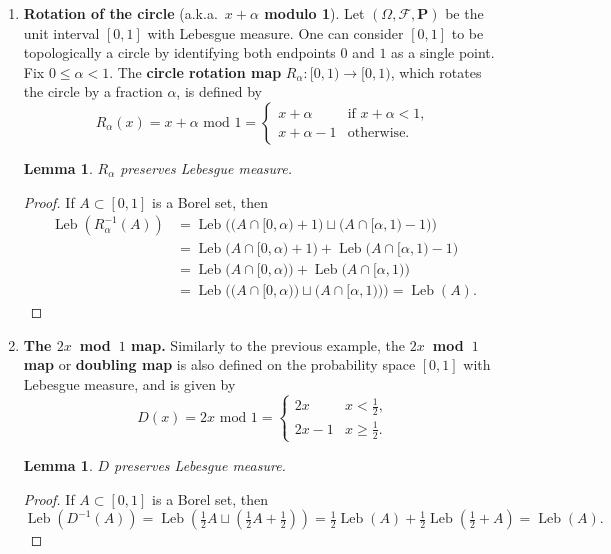 \documentclass[12pt]{article}
\newtheorem{lem}[thm]{Lemma}
\newcommand{\prob}{\mathbf{P}}
\theoremstyle{example}
\begin{document}
\begin{enumerate}[1.]
\item \textbf{Rotation of the circle} (a.k.a.\ \textbf{$x+\alpha$ modulo 1}).
Let $(\Omega,\mathcal{F},\prob)$ be the unit interval $[0,1]$ with Lebesgue measure. One can consider $[0,1]$ to be topologically a circle by identifying both endpoints $0$ and $1$ as a single point. Fix $0\le \alpha<1$. The \textbf{circle rotation map} $R_\alpha:[0,1)\to[0,1)$, which rotates the circle by a fraction $\alpha$, is defined by
$$ R_\alpha(x) = x+\alpha \textrm{\ mod\ } 1 = \begin{cases} x+\alpha & \textrm{if }x+\alpha<1, \\ x+\alpha-1&\textrm{otherwise}. \end{cases}
$$
\begin{lem}
$R_\alpha$ preserves Lebesgue measure.
\end{lem}

\begin{proof} If $A\subset [0,1]$ is a Borel set, then
\begin{align*}
\operatorname{Leb}(R_\alpha^{-1}(A)) &= 
\operatorname{Leb}\Big( \big(A\cap[0,\alpha)+1\big) \sqcup \big(A\cap[\alpha,1)-1\big) \Big)
\\ &=
\operatorname{Leb}\big(A\cap[0,\alpha)+1\big) 
+  \operatorname{Leb}\big(A\cap[\alpha,1)-1\big) \\ &=
\operatorname{Leb}\big(A\cap[0,\alpha)\big) 
+  \operatorname{Leb}\big(A\cap[\alpha,1)\big) \\ &=
\operatorname{Leb}\Big( \big(A\cap[0,\alpha)\big) \sqcup \big(A\cap[\alpha,1)\big) \Big)
=
\operatorname{Leb}(A).
\end{align*}
\end{proof}


\item \textbf{The $2x$~mod~$1$ map.} Similarly to the previous example, the \textbf{$2x$~mod~$1$ map} or \textbf{doubling map} is also defined on the probability space $[0,1]$ with Lebesgue measure, and is given by
$$ D(x) = 2x\textrm{ mod }1 = \begin{cases} 2x&x<\tfrac12, \\ 2x-1&x\ge\tfrac12. \end{cases}
$$

\begin{lem}
$D$ preserves Lebesgue measure.
\end{lem}

\begin{proof} If $A\subset [0,1]$ is a Borel set, then
$$ \operatorname{Leb}(D^{-1}(A)) = 
 \operatorname{Leb}\left(\tfrac12 A \sqcup \left(\tfrac12 A+\tfrac12\right) \right)
 = \tfrac12 \operatorname{Leb}(A)
 + \tfrac12 \operatorname{Leb}(\tfrac12+A) =
\operatorname{Leb}(A).
$$
\end{proof}


\end{enumerate}
\end{document}
